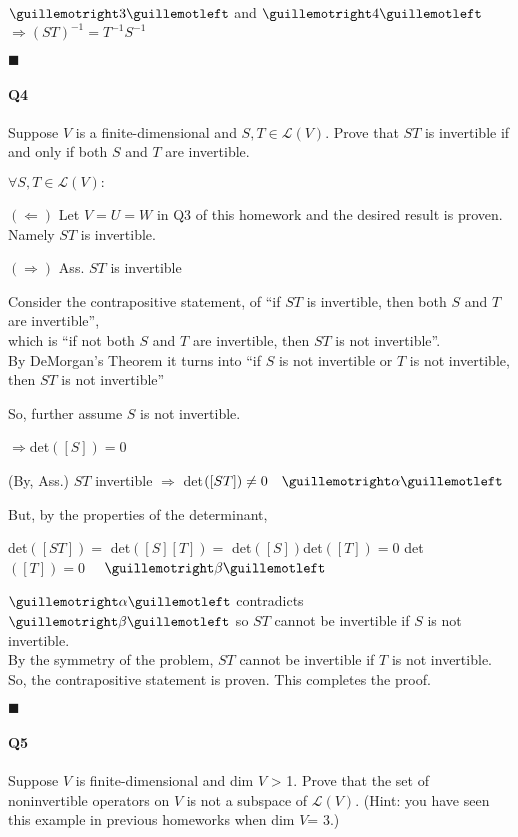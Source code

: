 \documentclass{article}
\begin{document}
$\guillemotright 3 \guillemotleft$ and $\guillemotright 4 \guillemotleft$ $\Rightarrow (ST)^{-1}=T^{-1}S^{-1}$


\vspace{0.618 em}
$\blacksquare$

\newpage
\paragraph{Q4} Suppose $V$ is a finite-dimensional and $S, T ∈ \mathcal{L}(V)$. Prove that $ST$ is
invertible if and only if both $S$ and $T$ are invertible.

\vspace{0.618 em}

$\forall S,T \in \mathcal{L}(V):$

$(\Leftarrow)$ Let $V=U=W$ in Q3 of this homework and the desired
result is proven. Namely $ST$ is invertible.

$(\Rightarrow)$ Ass. $ST$ is invertible

Consider the contrapositive statement, of ``if $ST$ is invertible, then
both $S$ and $T$ are invertible'',\\ which is ``if not
both $S$ and $T$ are invertible, then $ST$ is not invertible''.\\ By
DeMorgan's Theorem it turns into ``if $S$ is not invertible or $T$ is not
invertible, then $ST$ is not invertible''

So, further assume $S$ is not invertible.

$\Rightarrow $det$([S])=0$

(By, Ass.) $ST$ invertible $\Rightarrow$ det$([ST]) \neq 0 \quad \guillemotright \alpha \guillemotleft$

But, by the properties of the determinant,

det$([ST]) =$ det$([S][T]) =$ det$([S])$det$([T]) = 0$ det$([T]) =0
\quad$ $\guillemotright \beta \guillemotleft$

$\guillemotright \alpha \guillemotleft$ contradicts $\guillemotright \beta \guillemotleft$ so $ST$ cannot be invertible if $S$
is not invertible.\\
By the symmetry of the problem, $ST$ cannot be invertible if $T$ is
not invertible.\\
So, the contrapositive statement is proven. This completes the proof.


\vspace{0.618 em}
$\blacksquare$

\paragraph{Q5} Suppose $V$ is finite-dimensional and dim $V$ > 1. Prove that the
set of noninvertible operators on $V$ is not a subspace of $\mathcal{L}(V)$. (Hint: you have seen this
example in previous homeworks when dim $V$= 3.)
\end{document}

